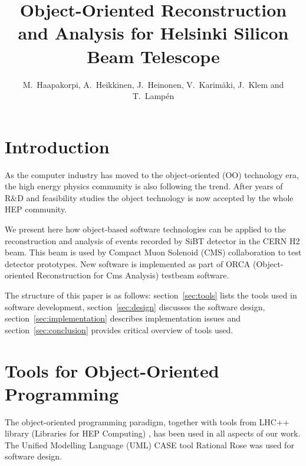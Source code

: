 \documentclass{hep99}
\begin{document}
\title{Object-Oriented Reconstruction and Analysis for
Helsinki Silicon Beam Telescope}
\author{M.~Haapakorpi, A.~Heikkinen, J.~Heinonen, V.~Karim\"aki,
J.~Klem and T.~Lamp\'en}
\address{Helsinki Institute of Physics, University of Helsinki,
Finland\\[3pt]
E-mail: {\tt Aatos.Heikkinen@cern.ch}}

\maketitle
\section{Introduction}
As the computer industry has moved
to the object-oriented (OO) technology era, the high energy physics
community is also following the trend.
After years of R\&D and feasibility studies the object technology is now
accepted by the whole HEP community.

We present here how object-based software technologies can be applied
to the reconstruction and analysis of events recorded by SiBT 
detector\cite{sibt}
in the CERN H2 beam. 
This beam is used by Compact Muon Solenoid (CMS)
\cite{cms} collaboration to test detector prototypes. New software is
implemented as part of ORCA (Object-oriented Reconstruction for Cms
Analysis) testbeam software.

The structure of this paper is as follows:
section~\ref{sec:tools} lists the tools used in software development,
section~\ref{sec:design} discusses the software design,
section~\ref{sec:implementation} describes implementation issues and
section~\ref{sec:conclusion} provides critical overview of tools used.

\section{Tools for Object-Oriented Programming\label{sec:tools}}

The object-oriented programming  paradigm, together with tools from
LHC++ library (Libraries for HEP Computing) \cite{lhc++},
has been used in all aspects of our work. 
The Unified Modelling Language (UML) CASE tool Rational Rose was used
for software design.
\end{document}
